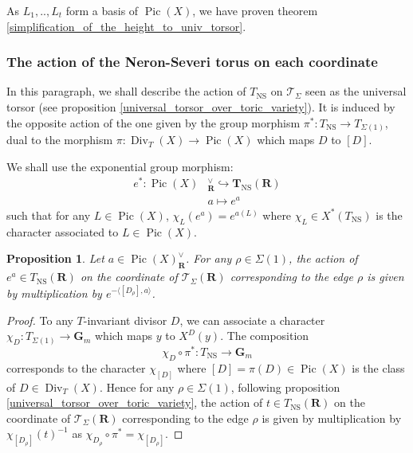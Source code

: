 \documentclass{proc-l}
\newcommand{\R}{\mathbf{R}}
\newcommand{\G}{\mathbf{G}}
\newcommand{\T}{\mathbf{T}}
\DeclareMathOperator{\Pic}{Pic}
\DeclareMathOperator{\Div}{Div}
\DeclareMathOperator{\NS}{NS}
\newcommand{\stackT}{\mathcal{T}}
\newtheorem{prop}[theorem]{Proposition}
\theoremstyle{definition}
\theoremstyle{remark}
\numberwithin{equation}{section}
\begin{document}
As $L_1,..,L_t$ form a basis of $\Pic(X)$, we have proven theorem \ref{simplification_of_the_height_to_univ_torsor}.



\subsubsection{The action of the Neron-Severi torus on each coordinate}\label{paragraph_action_Tns_coordonee}

In this paragraph, we shall describe the action of $T_{\NS}$ on $ \stackT_{\Sigma}$ seen as the universal torsor (see proposition \ref{universal_torsor_over_toric_variety}). It is induced by the opposite action of the one given by the group morphism $\pi^* : T_{\NS} \rightarrow T_{\Sigma(1)} $, dual to the morphism $\pi : \Div_T(X) \rightarrow \Pic(X)$ which maps $D$ to $[D]$.

We shall use the exponential group morphism:
\begin{align*}
    e^* : \Pic(X)&^{\vee}_{\R} \hookrightarrow \T_{\NS}(\R) \\
    &a \longmapsto e^a
\end{align*}such that for any $L \in \Pic(X)$, $\chi_L(e^a) = e^{a(L)} $ where $\chi_L \in X^*(T_{\NS})$ is the character associated to $L \in \Pic(X)$.

\begin{prop}\label{element_important_du_tore_NS}
    Let $a \in \Pic(X)^{\vee}_{\R}$. For any $\rho \in \Sigma(1)$, the action of $e^{a} \in T_{\NS}(\R)$ on the coordinate of $\stackT_{\Sigma}(\R)$ corresponding to the edge $\rho$ is given by multiplication by $e^{- \langle [D_{\rho}],a\rangle}$.
\end{prop}

\begin{proof}
    To any $T$-invariant divisor $D$, we can associate a character $\chi_{D} : T_{\Sigma(1)} \rightarrow \G_m$ which maps $y$ to $X^D(y)$. The composition $$\chi_{D} \circ \pi^* : T_{\NS} \rightarrow \G_m$$ corresponds to the character $\chi_{[D]}$ where $[D] = \pi(D) \in \Pic(X)$ is the class of $D \in \Div_T(X)$.
    Hence for any $\rho \in \Sigma(1)$, following proposition \ref{universal_torsor_over_toric_variety}, the action of $t \in T_{\NS}(\R)$ on the coordinate of $\stackT_{\Sigma}(\R)$ corresponding to the edge $\rho$ is given by multiplication by $\chi_{[D_{\rho}]}(t)^{-1}$ as $\chi_{D_{\rho}} \circ \pi^* = \chi_{[D_{\rho}]}$.
\end{proof}
\end{document}
